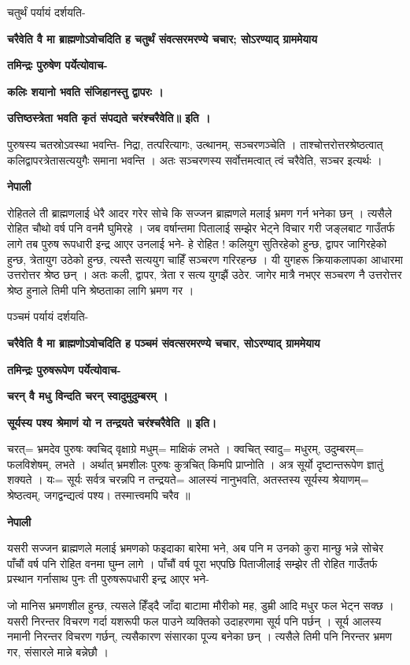 \documentclass[11pt, a5paper]{article}
\begin{document}
चतुर्थं पर्यायं दर्शयति-

\textbf{चरैवेति वै मा ब्राह्मणोऽवोचदिति ह चतुर्थं संवत्सरमरण्ये चचार; सोऽरण्याद् ग्राममेयाय}

\textbf{तमिन्द्रः पुरुषेण पर्येत्योवाच-}

\textbf{कलिः शयानो भवति संजिहानस्तु द्वापरः ।}

\textbf{उत्तिष्ठस्त्रेता भवति कृतं संपद्यते चरंश्चरैवेति॥ इति ।}

पुरुषस्य चतस्रोऽवस्था भवन्ति- निद्रा, तत्परित्यागः, उत्थानम्, सञ्चरणञ्चेति । ताश्चोत्तरोत्तरश्रेष्ठत्वात् कलिद्वापरत्रेतासत्ययुगैः समाना भवन्ति । अतः सञ्चरणस्य सर्वोत्तमत्वात् त्वं चरैवेति, सञ्चर इत्यर्थः ।

\textbf{नेपाली}

रोहितले ती ब्राह्मणलाई धेरै आदर गरेर सोचे कि सज्जन ब्राह्मणले मलाई भ्रमण गर्न भनेका छन् । त्यसैले रोहित चौथो वर्ष पनि वनमै घुमिरहे । जब वर्षान्तमा पितालाई सम्झेर भेट्ने विचार गरी जङ्‍लबाट गाउँतर्फ लागे तब पुरुष रूपधारी इन्द्र आएर उनलाई भने- हे रोहित ! कलियुग सुतिरहेको हुन्छ, द्वापर जागिरहेको हुन्छ, त्रेतायुग उठेको हुन्छ, त्यस्तै सत्ययुग चाहिँ सञ्चरण गरिरहन्छ । यी युगहरू क्रियाकलापका आधारमा उत्तरोत्तर श्रेष्ठ छन् । अतः कली, द्वापर, त्रेता र सत्य युगझैं उठेर. जागेर मात्रै नभएर सञ्चरण नै उत्तरोत्तर श्रेष्ठ हुनाले तिमी पनि श्रेष्ठताका लागि भ्रमण गर ।

पञ्चमं पर्यायं दर्शयति-

\textbf{चरैवेति वै मा ब्राह्मणोऽवोचदिति ह पञ्चमं संवत्सरमरण्ये चचार, सोऽरण्याद् ग्राममेयाय}

\textbf{तमिन्द्रः पुरुषरूपेण पर्येत्योवाच-}

\textbf{चरन् वै मधु विन्दति चरन् स्वादुमुदुम्बरम् ।}

\textbf{सूर्यस्य पश्य श्रेमाणं यो न तन्द्रयते चरंश्चरैवेति ॥ इति।}

चरत्= भ्रमदेव पुरुषः क्वचिद् वृक्षाग्रे मधुम्= माक्षिकं लभते । क्वचित् स्वादु= मधुरम्, उदुम्बरम्= फलविशेषम्, लभते । अर्थात् भ्रमशीलः पुरुषः कुत्रचित् किमपि प्राप्नोति । अत्र सूर्यो दृष्टान्तरूपेण ज्ञातुं शक्यते । यः= सूर्यः सर्वत्र चरन्नपि न तन्द्रयते= आलस्यं नानुभवति, अतस्तस्य सूर्यस्य श्रेयाणम्= श्रेष्ठत्वम्, जगद्वन्द्यत्वं पश्य। तस्मात्त्वमपि चरैव ॥

\textbf{नेपाली}

यसरी सज्जन ब्राह्मणले मलाई भ्रमणको फइदाका बारेमा भने, अब पनि म उनको कुरा मान्छु भन्ने सोचेर पाँचौं वर्ष पनि रोहित वनमा घुम्न लागे । पाँचौं वर्ष पूरा भएपछि पिताजीलाई सम्झेर ती रोहित गाउँतर्फ प्रस्थान गर्नासाथ पुनः ती पुरुषरूपधारी इन्द्र आएर भने-

जो मानिस भ्रमणशील हुन्छ, त्यसले हिँड्‌दै जाँदा बाटामा मौरीको मह, डुम्री आदि मधुर फल भेट्न सक्छ । यसरी निरन्तर विचरण गर्दा यशरूपी फल पाउने व्यक्तिको उदाहरणमा सूर्य पनि पर्छन् । सूर्य आलस्य नमानी निरन्तर विचरण गर्छन्, त्यसैकारण संसारका पूज्य बनेका छन् । त्यसैले तिमी पनि निरन्तर भ्रमण गर, संसारले मान्ने बन्नेछौ ।
\end{document}
